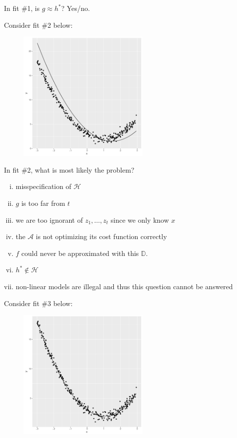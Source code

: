 \documentclass[12pt]{article}
\begin{document}
 In fit \#1, is $g \approx h^*$? Yes/no.

\noindent Consider fit \#2 below:

\begin{figure}[htp]
\centering
\includegraphics[width=2.5in]{curvybadcurve}
\end{figure}


 In fit \#2, what is most likely the problem?

\begin{enumerate}[i)]
\item misspecification of $\mathcal{H}$
\item $g$ is too far from $t$
\item we are too ignorant of $z_1, \ldots, z_t$ since we only know $x$
\item the $\mathcal{A}$ is not optimizing its cost function correctly
\item $f$ could never be approximated with this $\mathbb{D}$.
\item $h^* \notin \mathcal{H}$
\item non-linear models are illegal and thus this question cannot be answered
\end{enumerate}

\noindent Consider fit \#3 below:

\begin{figure}[htp]
\centering
\includegraphics[width=2.5in]{curvygoodcurve}
\end{figure}
\end{document}

